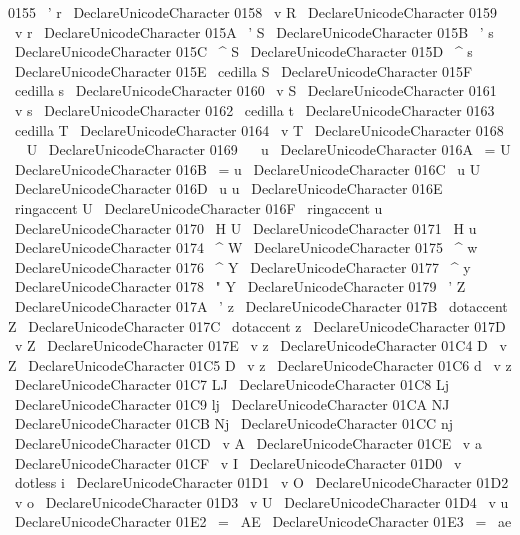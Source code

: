 {{{{{{
0155
}
{
\
'
r
}
\
DeclareUnicodeCharacter
{
0158
}
{
\
v
{
R
}
}
\
DeclareUnicodeCharacter
{
0159
}
{
\
v
{
r
}
}
\
DeclareUnicodeCharacter
{
015A
}
{
\
'
S
}
\
DeclareUnicodeCharacter
{
015B
}
{
\
'
s
}
\
DeclareUnicodeCharacter
{
015C
}
{
\
^
S
}
\
DeclareUnicodeCharacter
{
015D
}
{
\
^
s
}
\
DeclareUnicodeCharacter
{
015E
}
{
\
cedilla
{
S
}
}
\
DeclareUnicodeCharacter
{
015F
}
{
\
cedilla
{
s
}
}
\
DeclareUnicodeCharacter
{
0160
}
{
\
v
{
S
}
}
\
DeclareUnicodeCharacter
{
0161
}
{
\
v
{
s
}
}
\
DeclareUnicodeCharacter
{
0162
}
{
\
cedilla
{
t
}
}
\
DeclareUnicodeCharacter
{
0163
}
{
\
cedilla
{
T
}
}
\
DeclareUnicodeCharacter
{
0164
}
{
\
v
{
T
}
}
\
DeclareUnicodeCharacter
{
0168
}
{
\
~
U
}
\
DeclareUnicodeCharacter
{
0169
}
{
\
~
u
}
\
DeclareUnicodeCharacter
{
016A
}
{
\
=
U
}
\
DeclareUnicodeCharacter
{
016B
}
{
\
=
u
}
\
DeclareUnicodeCharacter
{
016C
}
{
\
u
{
U
}
}
\
DeclareUnicodeCharacter
{
016D
}
{
\
u
{
u
}
}
\
DeclareUnicodeCharacter
{
016E
}
{
\
ringaccent
{
U
}
}
\
DeclareUnicodeCharacter
{
016F
}
{
\
ringaccent
{
u
}
}
\
DeclareUnicodeCharacter
{
0170
}
{
\
H
{
U
}
}
\
DeclareUnicodeCharacter
{
0171
}
{
\
H
{
u
}
}
\
DeclareUnicodeCharacter
{
0174
}
{
\
^
W
}
\
DeclareUnicodeCharacter
{
0175
}
{
\
^
w
}
\
DeclareUnicodeCharacter
{
0176
}
{
\
^
Y
}
\
DeclareUnicodeCharacter
{
0177
}
{
\
^
y
}
\
DeclareUnicodeCharacter
{
0178
}
{
\
"
Y
}
\
DeclareUnicodeCharacter
{
0179
}
{
\
'
Z
}
\
DeclareUnicodeCharacter
{
017A
}
{
\
'
z
}
\
DeclareUnicodeCharacter
{
017B
}
{
\
dotaccent
{
Z
}
}
\
DeclareUnicodeCharacter
{
017C
}
{
\
dotaccent
{
z
}
}
\
DeclareUnicodeCharacter
{
017D
}
{
\
v
{
Z
}
}
\
DeclareUnicodeCharacter
{
017E
}
{
\
v
{
z
}
}
\
DeclareUnicodeCharacter
{
01C4
}
{
D
\
v
{
Z
}
}
\
DeclareUnicodeCharacter
{
01C5
}
{
D
\
v
{
z
}
}
\
DeclareUnicodeCharacter
{
01C6
}
{
d
\
v
{
z
}
}
\
DeclareUnicodeCharacter
{
01C7
}
{
LJ
}
\
DeclareUnicodeCharacter
{
01C8
}
{
Lj
}
\
DeclareUnicodeCharacter
{
01C9
}
{
lj
}
\
DeclareUnicodeCharacter
{
01CA
}
{
NJ
}
\
DeclareUnicodeCharacter
{
01CB
}
{
Nj
}
\
DeclareUnicodeCharacter
{
01CC
}
{
nj
}
\
DeclareUnicodeCharacter
{
01CD
}
{
\
v
{
A
}
}
\
DeclareUnicodeCharacter
{
01CE
}
{
\
v
{
a
}
}
\
DeclareUnicodeCharacter
{
01CF
}
{
\
v
{
I
}
}
\
DeclareUnicodeCharacter
{
01D0
}
{
\
v
{
\
dotless
{
i
}
}
}
\
DeclareUnicodeCharacter
{
01D1
}
{
\
v
{
O
}
}
\
DeclareUnicodeCharacter
{
01D2
}
{
\
v
{
o
}
}
\
DeclareUnicodeCharacter
{
01D3
}
{
\
v
{
U
}
}
\
DeclareUnicodeCharacter
{
01D4
}
{
\
v
{
u
}
}
\
DeclareUnicodeCharacter
{
01E2
}
{
\
=
{
\
AE
}
}
\
DeclareUnicodeCharacter
{
01E3
}
{
\
=
{
\
ae
}
}
\
}}}}}
